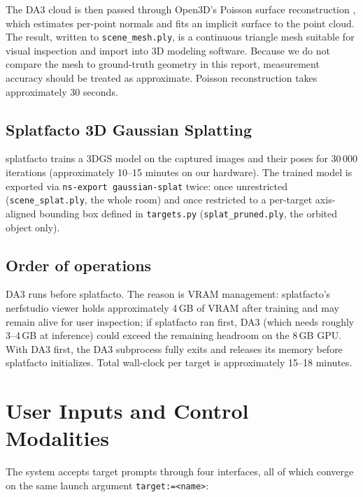 \documentclass[conference]{IEEEtran}
\begin{document}
The DA3 cloud is then passed through Open3D's Poisson surface
reconstruction \cite{kazhdan2006poisson, zhou2018open3d}, which
estimates per-point normals and fits an implicit surface to the
point cloud. The result, written to \texttt{scene\_mesh.ply}, is a
continuous triangle mesh suitable for visual inspection and import
into 3D modeling software. Because we do not compare the mesh to
ground-truth geometry in this report, measurement accuracy should
be treated as approximate. Poisson reconstruction takes
approximately 30 seconds.

\subsection{Splatfacto 3D Gaussian Splatting}

splatfacto \cite{tancik2023nerfstudio} trains a 3DGS model on the
captured images and their poses for 30\,000 iterations
(approximately 10--15 minutes on our hardware). The trained model
is exported via \texttt{ns-export gaussian-splat} twice: once
unrestricted (\texttt{scene\_splat.ply}, the whole room) and once
restricted to a per-target axis-aligned bounding box defined in
\texttt{targets.py} (\texttt{splat\_pruned.ply}, the orbited
object only).

\subsection{Order of operations}

DA3 runs before splatfacto. The reason is VRAM management:
splatfacto's nerfstudio viewer holds approximately 4\,GB of
VRAM after training and may remain alive for user inspection; if
splatfacto ran first, DA3 (which needs roughly 3--4\,GB at
inference) could exceed the remaining headroom on the 8\,GB GPU.
With DA3 first, the DA3 subprocess fully exits and releases its
memory before splatfacto initializes. Total wall-clock per target
is approximately 15--18 minutes.

\section{User Inputs and Control Modalities}

The system accepts target prompts through four interfaces, all
of which converge on the same launch argument
\texttt{target:=<name>}:
\end{document}
